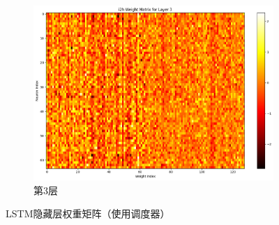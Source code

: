 \begin{figure}[H]
\begin{subfigure}{0.3\textwidth}
        \includegraphics[width=\linewidth]{../output/lstm/with scheduler/i2h Weight Matrix for Layer 3.png}
        \caption{第3层}
        \label{fig:lstmweightmatrixforlayer3withscheduler}
    \end{subfigure}
    \caption{LSTM隐藏层权重矩阵（使用调度器）}
    \label{fig:lstmweightmatrixwithscheduler}
\end{figure}

